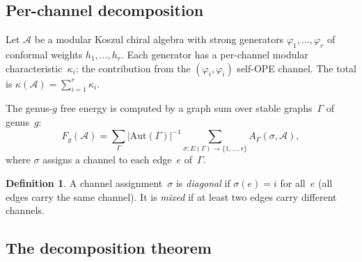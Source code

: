 \documentclass[11pt,reqno]{amsart}
\theoremstyle{definition}
\newtheorem{definition}[theorem]{Definition}
\theoremstyle{remark}
\newcommand{\cA}{\mathcal{A}}
\newcommand{\Aut}{\mathrm{Aut}}
\numberwithin{equation}{section}
\begin{document}
\subsection{Per-channel decomposition}

Let $\cA$ be a modular Koszul chiral algebra with strong
generators $\varphi_1,\ldots,\varphi_r$ of conformal weights
$h_1,\ldots,h_r$. Each generator has a per-channel modular
characteristic~$\kappa_i$: the contribution from the
$(\varphi_i,\varphi_i)$ self-OPE channel. The total is
$\kappa(\cA) = \sum_{i=1}^r\kappa_i$.

The genus-$g$ free energy is computed by a graph sum over
stable graphs~$\Gamma$ of genus~$g$:
\begin{equation}\label{eq:graph-sum}
F_g(\cA) = \sum_\Gamma |\Aut(\Gamma)|^{-1}
\sum_{\sigma\colon E(\Gamma) \to \{1,\ldots,r\}}
A_\Gamma(\sigma,\cA),
\end{equation}
where $\sigma$ assigns a channel to each edge~$e$
of~$\Gamma$.

\begin{definition}\label{def:diagonal-mixed}
A channel assignment~$\sigma$ is \emph{diagonal} if
$\sigma(e) = i$ for all~$e$ (all edges carry the same channel).
It is \emph{mixed} if at least two edges carry different
channels.
\end{definition}

\subsection{The decomposition theorem}
\end{document}
